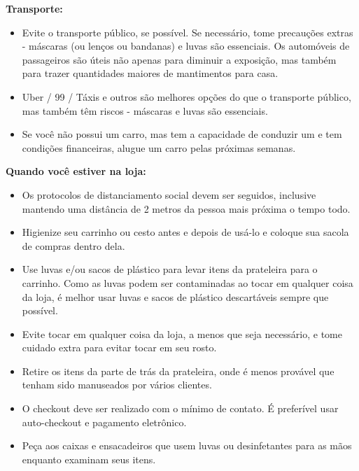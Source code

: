 \documentclass[onecolumn,journal]{IEEEtran}
\begin{document}
\begin{multicols}{2}
\vspace{2ex}

\textbf{Transporte:}

\vspace{2ex}

\begin{itemize}
    \item Evite o transporte público, se possível. Se necessário, tome precauções extras - máscaras (ou lenços ou bandanas) e luvas são essenciais. Os automóveis de passageiros são úteis não apenas para diminuir a exposição, mas também para trazer quantidades maiores de mantimentos para casa.
    \item Uber / 99 / Táxis e outros são melhores opções do que o transporte público, mas também têm riscos - máscaras e luvas são essenciais.
    \item Se você não possui um carro, mas tem a capacidade de conduzir um e tem condições financeiras, alugue um carro pelas próximas semanas.
\end{itemize}

\vspace{2ex}

\textbf{Quando você estiver na loja:}

\vspace{2ex}

\begin{itemize}
    \item Os protocolos de distanciamento social devem ser seguidos, inclusive mantendo uma distância de 2 metros da pessoa mais próxima o tempo todo.
    \item Higienize seu carrinho ou cesto antes e depois de usá-lo e coloque sua sacola de compras dentro dela.
    \item Use luvas e/ou sacos de plástico para levar itens da prateleira para o carrinho. Como as luvas podem ser contaminadas ao tocar em qualquer coisa da loja, é melhor usar luvas e sacos de plástico descartáveis sempre que possível.
    \item Evite tocar em qualquer coisa da loja, a menos que seja necessário, e tome cuidado extra para evitar tocar em seu rosto.
    \item Retire os itens da parte de trás da prateleira, onde é menos provável que tenham sido manuseados por vários clientes.
    \item O checkout deve ser realizado com o mínimo de contato. É preferível usar auto-checkout e pagamento eletrônico.
    \item Peça aos caixas e ensacadeiros que usem luvas ou desinfetantes para as mãos enquanto examinam seus itens.
\end{itemize}


\end{multicols}
\end{document}
